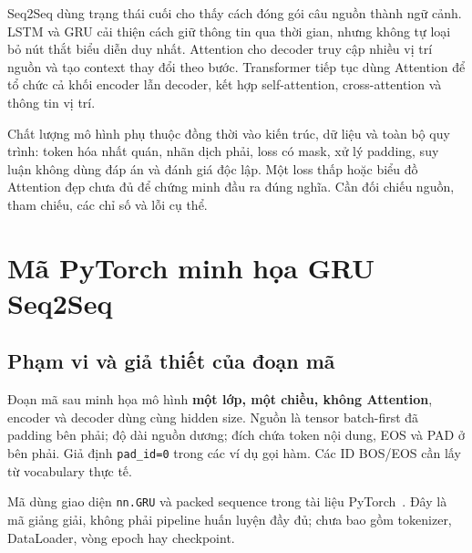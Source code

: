 \documentclass[11pt,a4paper]{article}
\numberwithin{equation}{section}
\begin{document}
Seq2Seq dùng trạng thái cuối cho thấy cách đóng gói câu nguồn thành ngữ cảnh. LSTM và GRU cải thiện cách giữ thông tin qua thời gian, nhưng không tự loại bỏ nút thắt biểu diễn duy nhất. Attention cho decoder truy cập nhiều vị trí nguồn và tạo context thay đổi theo bước. Transformer tiếp tục dùng Attention để tổ chức cả khối encoder lẫn decoder, kết hợp self-attention, cross-attention và thông tin vị trí.

Chất lượng mô hình phụ thuộc đồng thời vào kiến trúc, dữ liệu và toàn bộ quy trình: token hóa nhất quán, nhãn dịch phải, loss có mask, xử lý padding, suy luận không dùng đáp án và đánh giá độc lập. Một loss thấp hoặc biểu đồ Attention đẹp chưa đủ để chứng minh đầu ra đúng nghĩa. Cần đối chiếu nguồn, tham chiếu, các chỉ số và lỗi cụ thể.

\clearpage
\appendix
\section{Mã PyTorch minh họa GRU Seq2Seq}
\subsection{Phạm vi và giả thiết của đoạn mã}
Đoạn mã sau minh họa mô hình \textbf{một lớp, một chiều, không Attention}, encoder và decoder dùng cùng hidden size. Nguồn là tensor batch-first đã padding bên phải; độ dài nguồn dương; đích chứa token nội dung, EOS và PAD ở bên phải. Giả định \texttt{pad\_id=0} trong các ví dụ gọi hàm. Các ID BOS/EOS cần lấy từ vocabulary thực tế.

Mã dùng giao diện \texttt{nn.GRU} và packed sequence trong tài liệu PyTorch~\cite{torchgru,torchpack}. Đây là mã giảng giải, không phải pipeline huấn luyện đầy đủ; chưa bao gồm tokenizer, DataLoader, vòng epoch hay checkpoint.
\end{document}
